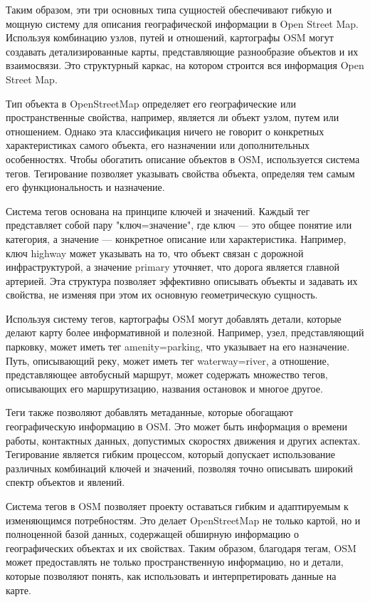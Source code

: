 Таким образом, эти три основных типа сущностей обеспечивают гибкую и мощную систему для описания географической информации в Open Street Map. Используя комбинацию узлов, путей и отношений, картографы OSM могут создавать детализированные карты, представляющие разнообразие объектов и их взаимосвязи. Это структурный каркас, на котором строится вся информация Open Street Map.

Тип объекта в OpenStreetMap определяет его географические или пространственные свойства, например, является ли объект узлом, путем или отношением. Однако эта классификация ничего не говорит о конкретных характеристиках самого объекта, его назначении или дополнительных особенностях. Чтобы обогатить описание объектов в OSM, используется система тегов. Тегирование позволяет указывать свойства объекта, определяя тем самым его функциональность и назначение.

Система тегов основана на принципе ключей и значений. Каждый тег представляет собой пару "ключ=значение", где ключ — это общее понятие или категория, а значение — конкретное описание или характеристика. Например, ключ highway может указывать на то, что объект связан с дорожной инфраструктурой, а значение primary уточняет, что дорога является главной артерией. Эта структура позволяет эффективно описывать объекты и задавать их свойства, не изменяя при этом их основную геометрическую сущность.

Используя систему тегов, картографы OSM могут добавлять детали, которые делают карту более информативной и полезной. Например, узел, представляющий парковку, может иметь тег amenity=parking, что указывает на его назначение. Путь, описывающий реку, может иметь тег waterway=river, а отношение, представляющее автобусный маршрут, может содержать множество тегов, описывающих его маршрутизацию, названия остановок и многое другое.

Теги также позволяют добавлять метаданные, которые обогащают географическую информацию в OSM. Это может быть информация о времени работы, контактных данных, допустимых скоростях движения и других аспектах. Тегирование является гибким процессом, который допускает использование различных комбинаций ключей и значений, позволяя точно описывать широкий спектр объектов и явлений.

Система тегов в OSM позволяет проекту оставаться гибким и адаптируемым к изменяющимся потребностям. Это делает OpenStreetMap не только картой, но и полноценной базой данных, содержащей обширную информацию о географических объектах и их свойствах. Таким образом, благодаря тегам, OSM может предоставлять не только пространственную информацию, но и детали, которые позволяют понять, как использовать и интерпретировать данные на карте.

